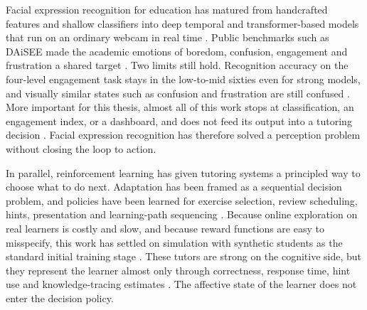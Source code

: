 Facial expression recognition for education has matured from handcrafted features and shallow classifiers into deep temporal and transformer-based models that run on an ordinary webcam in real time \cite{lek_academic_2023,su_leveraging_2024,aly_comprehensive_2025,liu_dynamic_2026}. Public benchmarks such as \ac{DAiSEE} made the academic emotions of boredom, confusion, engagement and frustration a shared target \cite{gupta_daisee_2016}. Two limits still hold. Recognition accuracy on the four-level engagement task stays in the low-to-mid sixties even for strong models, and visually similar states such as confusion and frustration are still confused \cite{abedi_improving_2021,rianto_engagement_2025,lek_academic_2023}. More important for this thesis, almost all of this work stops at classification, an engagement index, or a dashboard, and does not feed its output into a tutoring decision \cite{rao_recognition_2021,komaravalli_detecting_2023,leong_deep_2020,aly_comprehensive_2025}. Facial expression recognition has therefore solved a perception problem without closing the loop to action.

In parallel, reinforcement learning has given tutoring systems a principled way to choose what to do next. Adaptation has been framed as a sequential decision problem, and policies have been learned for exercise selection, review scheduling, hints, presentation and learning-path sequencing \cite{azoulay_adaptive_2021,kubotani_rltutor_2021,sayed_ai-based_2023,fu_integrating_2025,zou_deep_2026}. Because online exploration on real learners is costly and slow, and because reward functions are easy to misspecify, this work has settled on simulation with synthetic students as the standard initial training stage \cite{dulacarnold_challenges_2021,sanz_ausin_leveraging_2019,li_reinforcement_2022,olukola_pedagogical_2026}. These tutors are strong on the cognitive side, but they represent the learner almost only through correctness, response time, hint use and knowledge-tracing estimates \cite{azoulay_adaptive_2021,fu_integrating_2025,guzman_developing_2025,zou_deep_2026}. The affective state of the learner does not enter the decision policy.

